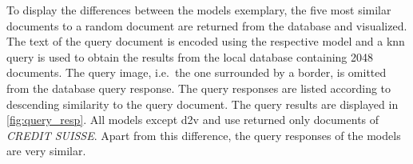 To display the differences between the models exemplary, the five most similar documents to a random document are returned from the database and visualized.
The text of the query document is encoded using the respective model and a 
\ac{knn} query is used to obtain the results from the local database containing 2048 documents.
The query image, i.e.\ the one surrounded by a border, is omitted from the database query response.
The query responses are listed according to descending similarity to the query document.
The query results are displayed in \autoref{fig:query_resp}.
All models except \ac{d2v} and \ac{use} returned only documents of \textit{CREDIT SUISSE}.
Apart from this difference, the query responses of the models are very similar.


